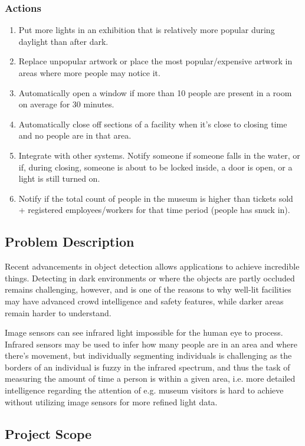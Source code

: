 \subsubsection*{Actions}
\begin{enumerate}
    \item Put more lights in an exhibition that is relatively more popular during daylight than after dark.
    \item Replace unpopular artwork or place the most popular/expensive artwork in areas where more people may notice it.
    \item Automatically open a window if more than 10 people are present in a room on average for 30 minutes.
    \item Automatically close off sections of a facility when it's close to closing time and no people are in that area.    
    \item Integrate with other systems. Notify someone if someone falls in the water, or if, during closing, someone is about to be locked inside, a door is open, or a light is still turned on. 
    \item Notify if the total count of people in the museum is higher than tickets sold + registered employees/workers for that time period (people has snuck in).
\end{enumerate} 

\subsection{Problem Description}
Recent advancements in object detection allows applications to achieve incredible things. Detecting in dark environments or where the objects are partly occluded remains challenging, however, and is one of the reasons to why well-lit facilities may have advanced crowd intelligence and safety features, while darker areas remain harder to understand. 

Image sensors can see infrared light impossible for the human eye to process. Infrared sensors may be used to infer how many people are in an area and where there's movement, but individually segmenting individuals is challenging as the borders of an individual is fuzzy in the infrared spectrum, and thus the task of measuring the amount of time a person is within a given area, i.e. more detailed intelligence regarding the attention of e.g. museum visitors is hard to achieve without utilizing image sensors for more refined light data.

\subsection{Project Scope}



